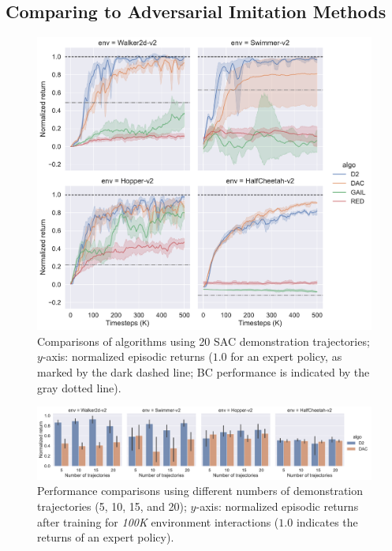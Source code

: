 \documentclass[letterpaper]{article} %
\begin{document}
\subsection{Comparing to Adversarial Imitation Methods}
\begin{figure}
\centering
\includegraphics[width=0.9\linewidth]{comparison_adversarial.pdf}
\caption{Comparisons of algorithms using 20 SAC demonstration trajectories; $y$-axis: normalized episodic returns ($1.0$ for an expert policy, as marked by the dark dashed line; BC performance is indicated by the gray dotted line). }
\label{fig:comparison-with-adversarial}
\end{figure}

\begin{figure}
\centering
\includegraphics[width=0.85\linewidth]{traj-num.pdf}
\caption{Performance comparisons using different numbers of demonstration trajectories (5, 10, 15, and 20);
$y$-axis: normalized episodic returns after training for \textit{100K} environment interactions ($1.0$ indicates the returns of an expert policy).}
\label{fig:comparison-num-traj}
\end{figure}
\end{document}
